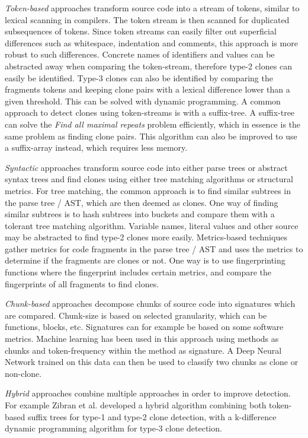 \documentclass[12pt]{article}
\begin{document}
\textit{Token-based} approaches transform source code into a stream of tokens, similar to
lexical scanning in compilers. The token stream is then scanned for duplicated
subsequences of tokens. Since token streams can easily filter out superficial differences
such as whitespace, indentation and comments, this approach is more robust to such
differences. Concrete names of identifiers and values can be abstracted away when comparing
the token-stream, therefore type-2 clones can easily be identified. Type-3 clones can also
be identified by comparing the fragments tokens and keeping clone pairs with a lexical
difference lower than a given threshold. This can be solved with dynamic
programming\cite{BakerSparseDynamicProgramming}. A common approach to detect clones using
token-streams is with a suffix-tree. A suffix-tree can solve the \textit{Find all maximal
repeats} problem efficiently, which in essence is the same problem as finding clone pairs.
This algorithm can also be improved to use a suffix-array instead, which requires less
memory.

\textit{Syntactic} approaches transform source code into either parse trees or abstract
syntax trees and find clones using either tree matching algorithms or structural metrics.
For tree matching, the common approach is to find similar subtrees in the parse tree /
AST, which are then deemed as clones. One way of finding similar subtrees is to hash
subtrees into buckets and compare them with a tolerant tree matching algorithm. Variable
names, literal values and other source may be abstracted to find type-2 clones more
easily. Metrics-based techniques gather metrics for code fragments in the parse tree / AST
and uses the metrics to determine if the fragments are clones or not. One way is to use
fingerprinting functions where the fingerprint includes certain metrics, and compare the
fingerprints of all fragments to find clones.

\textit{Chunk-based} approaches decompose chunks of source code into signatures which are
compared. Chunk-size is based on selected granularity, which can be functions, blocks,
etc. Signatures can for example be based on some software metrics. Machine learning has
been used in this approach using methods as chunks and token-frequency within the method
as signature. A Deep Neural Network trained on this data can then be used to classify two
chunks as clone or non-clone.

\textit{Hybrid} approaches combine multiple approaches in order to improve detection. For
example Zibran et al.\cite{Zibran_real_time_search} developed a hybrid algorithm
combining both token-based suffix trees for type-1 and type-2 clone detection, with
a k-difference dynamic programming algorithm for type-3 clone detection. 
\end{document}
